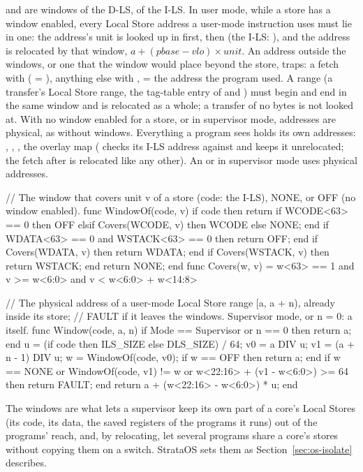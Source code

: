  and  are windows of the D-LS,  of the I-LS. In user mode, while a store
has a window enabled, every Local Store address a user-mode instruction uses must lie in one: the
address's unit is looked up in  first, then  (the I-LS: ), and the
address is relocated by that window, $a + (\textit{pbase} - \textit{vlo}) \times \textit{unit}$. An address
outside the windows, or one that the window would place beyond the store, traps: a fetch with
 ( = ), anything else with ,  = the address
the program used. A range (a transfer's Local Store range, the tag-table entry of  and
) must begin and end in the same window and is relocated as a whole; a transfer of no bytes
is not looked at. With no window enabled for a store, or in supervisor mode, addresses are physical,
as without windows. Everything a program sees holds its own addresses: , ,
, the overlay map ( checks its I-LS address against  and keeps it
unrelocated; the fetch after  is relocated like any other). An  or  in
supervisor mode uses physical addresses.

\begin{pseudo}
// The window that covers unit v of a store (code: the I-LS), NONE, or OFF (no window enabled).
func WindowOf(code, v)
    if code then return if WCODE<63> == 0 then OFF elsif Covers(WCODE, v) then WCODE else NONE; end
    if WDATA<63> == 0 and WSTACK<63> == 0 then return OFF; end
    if Covers(WDATA, v) then return WDATA; end
    if Covers(WSTACK, v) then return WSTACK; end
    return NONE;
end
func Covers(w, v) = w<63> == 1 and v >= w<6:0> and v < w<6:0> + w<14:8>

// The physical address of a user-mode Local Store range [a, a + n), already inside its store;
// FAULT if it leaves the windows. Supervisor mode, or n = 0: a itself.
func Window(code, a, n)
    if Mode == Supervisor or n == 0 then return a; end
    u = (if code then ILS_SIZE else DLS_SIZE) / 64;
    v0 = a DIV u;  v1 = (a + n - 1) DIV u;
    w = WindowOf(code, v0);
    if w == OFF then return a; end
    if w == NONE or WindowOf(code, v1) != w or w<22:16> + (v1 - w<6:0>) >= 64 then return FAULT; end
    return a + (w<22:16> - w<6:0>) * u;
end
\end{pseudo}

The windows are what lets a supervisor keep its own part of a core's Local Stores (its code, its data,
the saved registers of the programs it runs) out of the programs' reach, and, by relocating, let
several programs share a core's stores without copying them on a switch. StrataOS sets them as
Section~\ref{sec:os-isolate} describes.

